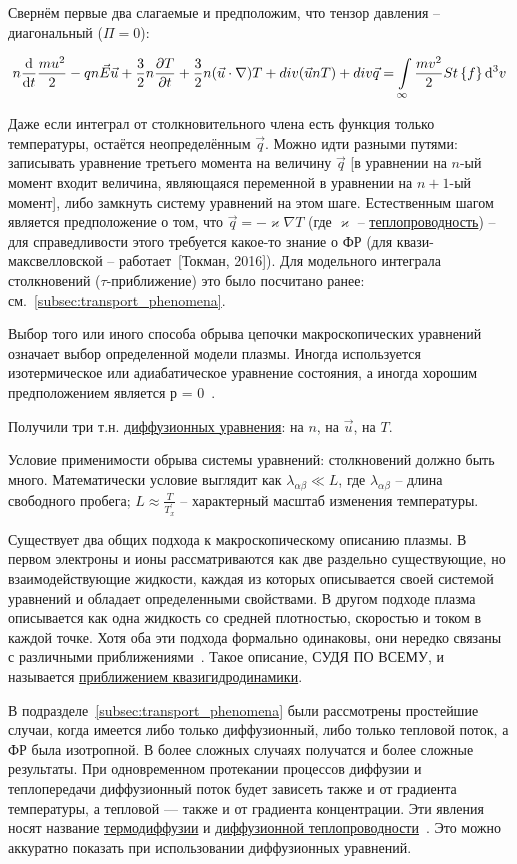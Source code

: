 \documentclass[10pt, a4paper]{article}
\newcommand{\Tokman}{~[Токман, 2016]}
\begin{document}
Свернём первые два слагаемые и предположим, что тензор давления -- диагональный ($\Pi = 0$):

\begin{equation*}
	n\dv{}{t}\frac{mu^2}{2}-qn\vec{E}\vec{u}+\frac{3}{2}n\pdv{T}{t}+\frac{3}{2}n(\vec{u}\cdot\nabla)T+div(\vec{u}nT)+div\vec{q}=\int\limits_\infty\frac{mv^2}{2}St\left\lbrace f\right\rbrace \dd[3]{v}
\end{equation*}

Даже если интеграл от столкновительного члена есть функция только температуры, остаётся неопределённым $\vec{q}$. Можно идти разными путями: записывать уравнение третьего момента на величину $\vec{q}$ [в уравнении на $n$-ый момент входит величина, являющаяся переменной в уравнении на $n+1$-ый момент], либо замкнуть систему уравнений на этом шаге. Естественным шагом является предположение о том, что $\vec{q}=-\varkappa\nabla T$ (где $\varkappa$ -- \uline{теплопроводность}) -- для справедливости этого требуется какое-то знание о ФР (для квази-максвелловской -- работает\Tokman). Для модельного интеграла столкновений ($\tau$-приближение) это было посчитано ранее: см.~\eqref{subsec:transport_phenomena}.

Выбор того или иного способа обрыва цепочки макроскопических уравнений означает выбор определенной модели плазмы. Иногда используется изотермическое или адиабатическое уравнение состояния, а иногда хорошим предположением является р = 0~\cite{kroll}.

Получили три т.н. \uline{диффузионных уравнения}: на $n$, на $\vec{u}$, на $T$.

Условие применимости обрыва системы уравнений: столкновений должно быть много. Математически условие выглядит как $\lambda_{\alpha\beta}\ll L$, где $\lambda_{\alpha\beta}$ -- длина свободного пробега; $L \approx \frac{T}{T^{'}_x}$ -- характерный масштаб изменения температуры.

Существует два общих подхода к макроскопическому описанию плазмы. В первом электроны и ионы рассматриваются как две раздельно существующие, но взаимодействующие жидкости, каждая из которых описывается своей системой
уравнений и обладает определенными свойствами. В другом подходе плазма
описывается как одна жидкость со средней плотностью, скоростью и током
в каждой точке. Хотя оба эти подхода формально одинаковы, они нередко
связаны с различными приближениями~\cite{kroll}. Такое описание, СУДЯ ПО ВСЕМУ, и называется \uline{приближением квазигидродинамики}.

В подразделе~\ref{subsec:transport_phenomena} были рассмотрены простейшие случаи, когда имеется
либо только диффузионный, либо только тепловой поток, а
ФР была изотропной. В более сложных
случаях получатся и более сложные результаты. При одновременном протекании процессов диффузии и теплопередачи
диффузионный поток будет зависеть также и от градиента
температуры, а тепловой — также и от градиента концентрации. Эти явления носят название \uline{термодиффузии} и \uline{диффузионной теплопроводности}~\cite{frank}. Это можно аккуратно показать при использовании диффузионных уравнений.
\end{document}
